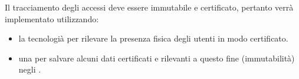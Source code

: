 Il tracciamento degli accessi deve essere immutabile e certificato, pertanto verrà implementato utilizzando:
\begin{itemize}
    \item la tecnologià  per rilevare la presenza fisica degli utenti in modo certificato. 
    \item una  per salvare alcuni dati certificati e rilevanti a questo fine (immutabilità) negli .
\end{itemize}